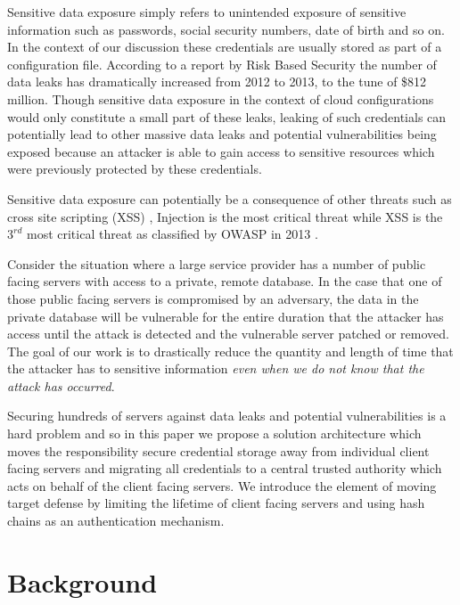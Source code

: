 \documentclass{sig-alternate-05-2015}
\begin{document}
Sensitive data exposure simply refers to unintended exposure of sensitive information such as passwords, social security numbers, date of birth and so on. In the context of our discussion these credentials are usually stored as part of a configuration file. According to a report by Risk Based Security \cite{risk_based_executives_2014} \cite{shu_privacy-preserving_2015} the number of data leaks has dramatically increased from 2012 to 2013, to the tune of \$812 million. Though sensitive data exposure in the context of cloud configurations would only constitute a small part of these leaks, leaking of such credentials can potentially lead to other massive data leaks and potential vulnerabilities being exposed because an attacker is able to gain access to sensitive resources which were previously protected by these credentials.

Sensitive data exposure can potentially be a consequence of other threats such as cross site scripting (XSS) \cite{louw_blueprint:_2009}, Injection is the most critical threat while XSS is the $3^{rd}$ most critical threat as classified by OWASP in 2013 \cite{wichers_owasp_2014}. 

Consider the situation where a large service provider has a number of public facing servers with access to a private, remote database.  In the case that one of those public facing servers is compromised by an adversary, the data in the private database will be vulnerable for the entire duration that the attacker has access until the attack is detected and the vulnerable server patched or removed.  The goal of our work is to drastically reduce the quantity and length of time that the attacker has to sensitive information \textit{even when we do not know that the attack has occurred}. 

Securing hundreds of servers against data leaks and potential vulnerabilities is a hard problem and so in this paper we propose a solution architecture which moves the responsibility secure credential storage away from individual client facing servers and migrating all credentials to a central trusted authority which acts on behalf of the client facing servers. We introduce the element of moving target defense by limiting the lifetime of client facing servers and using hash chains as an authentication mechanism.

\section{Background}
\end{document}
